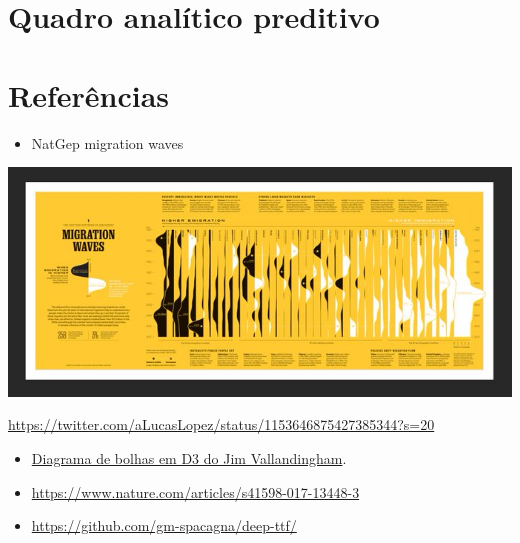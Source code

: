 \documentclass[]{book}
\providecommand{\tightlist}{%
  \setlength{\itemsep}{0pt}\setlength{\parskip}{0pt}}
\begin{document}
\hypertarget{quadro-analuxedtico-preditivo}{%
\chapter{Quadro analítico preditivo}\label{quadro-analuxedtico-preditivo}}

\hypertarget{referuxeancias}{%
\chapter*{Referências}\label{referuxeancias}}

\begin{itemize}
\tightlist
\item
  NatGep migration waves
\end{itemize}

\includegraphics{natgeo.jpg}

\url{https://twitter.com/aLucasLopez/status/1153646875427385344?s=20}

\begin{itemize}
\item
  \href{https://vallandingham.me/bubble_charts_with_d3v4.html}{Diagrama de bolhas em D3 do Jim Vallandingham}.
\item
  \url{https://www.nature.com/articles/s41598-017-13448-3}
\item
  \url{https://github.com/gm-spacagna/deep-ttf/}
\end{itemize}


\end{document}
